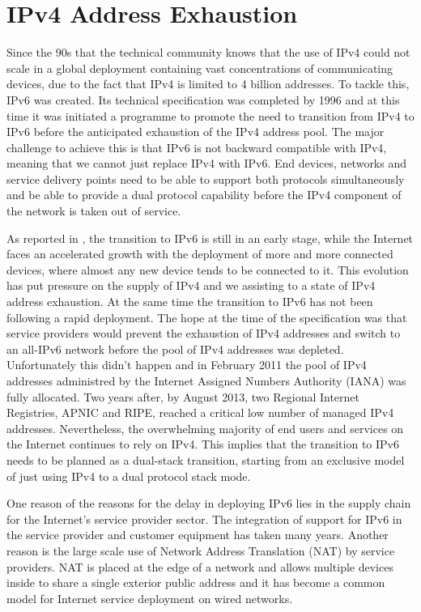 \documentclass[11pt,a4paper]{scrreprt}
\begin{document}
\section{IPv4 Address Exhaustion}

Since the 90s that the technical community knows that the use of IPv4 could not scale in a global deployment containing vast concentrations of communicating devices, due to the fact that IPv4 is limited to 4 billion addresses. To tackle this, IPv6 was created. Its technical specification was completed by 1996 and at this time it was initiated a programme to promote the need to transition from IPv4 to IPv6 before the anticipated exhaustion of the IPv4 address pool. The major challenge to achieve this is that IPv6 is not backward compatible with IPv4, meaning that we cannot just replace IPv4 with IPv6. End devices, networks and service delivery points need to be able to support both protocols simultaneously and be able to provide a dual protocol capability before the IPv4 component of the network is taken out of service.     

As reported in \cite{IPv6_state}, the transition to IPv6 is still in an early stage, while the Internet faces an accelerated growth with the deployment of more and more connected devices, where almost any new device tends to be connected to it.  This evolution has put pressure on the supply of IPv4 and we assisting to a state of IPv4 address exhaustion. At the same time the transition to IPv6 has not been following a rapid deployment. The hope at the time of the specification was that service providers would prevent the exhaustion of IPv4 addresses and switch to an all-IPv6 network before the pool of IPv4 addresses was depleted. Unfortunately this didn't happen and in February 2011 the pool of IPv4 addresses administred by the Internet Assigned Numbers Authority (IANA) was fully allocated. Two years after, by August 2013, two Regional Internet Registries, APNIC and RIPE, reached a critical low number of managed IPv4 addresses. Nevertheless, the overwhelming majority of end users and services on the Internet continues to rely on IPv4. This implies that the transition to IPv6 needs to be planned as a dual-stack transition, starting from an exclusive model of just using IPv4 to a dual protocol stack mode.

One reason of the reasons for the delay in deploying IPv6 lies in the supply chain for the Internet's service provider sector. The integration of support for IPv6 in the service provider and customer equipment has taken many years. Another reason is the large scale use of Network Address Translation (NAT) by service providers. NAT is placed at the edge of a network and allows multiple devices inside to share a single exterior public address and it has become a common model for Internet service deployment on wired networks. 
\end{document}
